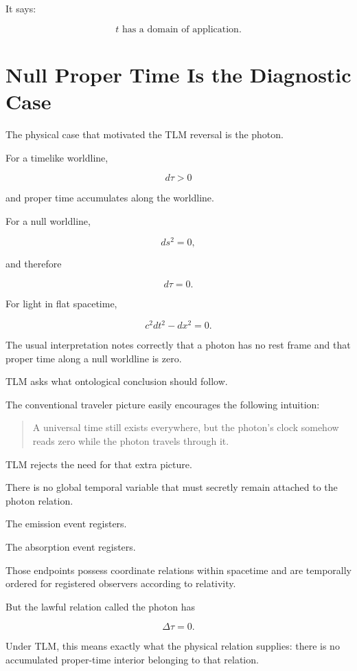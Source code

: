 \documentclass[12pt,onecolumn]{article}
\theoremstyle{plain}
\theoremstyle{definition}
\theoremstyle{remark}
\begin{document}
It says:

\[
\boxed{
t \text{ has a domain of application}.
}
\]


\section{Null Proper Time Is the Diagnostic Case}

The physical case that motivated the TLM reversal is the photon.

For a timelike worldline,

\[
d\tau > 0
\]

and proper time accumulates along the worldline.

For a null worldline,

\[
ds^2 = 0,
\]

and therefore

\[
d\tau = 0.
\]

For light in flat spacetime,

\[
c^2dt^2-dx^2=0.
\]

The usual interpretation notes correctly that a photon has no rest frame
and that proper time along a null worldline is zero.

TLM asks what ontological conclusion should follow.

The conventional traveler picture easily encourages the following
intuition:

\begin{quote}
A universal time still exists everywhere, but the photon's clock somehow
reads zero while the photon travels through it.
\end{quote}

TLM rejects the need for that extra picture.

There is no global temporal variable that must secretly remain attached to
the photon relation.

The emission event registers.

The absorption event registers.

Those endpoints possess coordinate relations within spacetime and are
temporally ordered for registered observers according to relativity.

But the lawful relation called the photon has

\[
\Delta\tau=0.
\]

Under TLM, this means exactly what the physical relation supplies: there is
no accumulated proper-time interior belonging to that relation.
\end{document}
